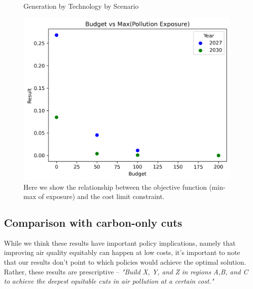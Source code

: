 \documentclass[a4paper]{article}
\theoremstyle{definition}
\theoremstyle{plain}
\begin{document}
\begin{figure}
    \centering
    \caption{Generation by Technology by Scenario}
\end{figure}

\begin{figure}
    \centering
    \includegraphics[width=0.7\linewidth]{Figures/EndogenousResults/base_short/exposure_cost_PPF.png}
    \caption{Here we show the relationship between the objective function (min-max of exposure) and the cost limit constraint.}
    \label{PPF}
\end{figure}

\subsection{Comparison with carbon-only cuts}
While we think these results have important policy implications, namely that improving air quality equitably can happen at low costs, it's important to note that our results don't point to which policies would achieve the optimal solution. Rather, these results are prescriptive -- \textit{"Build X, Y, and Z in regions A,B, and C to achieve the deepest equitable cuts in air pollution at a certain cost."} 
\end{document}
